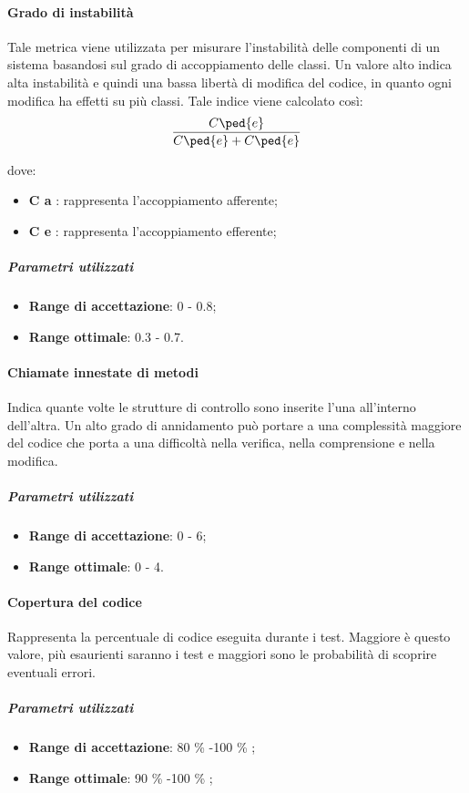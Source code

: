 \documentclass[../PianoDiQualifica.tex]{subfiles}
\begin{document}
					\paragraph{Grado di instabilità}
					Tale metrica viene utilizzata per misurare l'instabilità delle componenti di un sistema basandosi sul grado di accoppiamento delle classi. Un valore alto indica alta instabilità e quindi una bassa libertà di modifica del codice, in quanto ogni modifica ha effetti su più classi. Tale indice viene calcolato così:
					\[
					\frac{C \ped{e} }{C \ped{e}  +C \ped{e} }
					\]
					
					dove:
					\begin{itemize}
						\item \textbf{C \ped a }: rappresenta l'accoppiamento afferente;
						\item \textbf{C \ped e }: rappresenta l'accoppiamento efferente;
					\end{itemize}
					\subparagraph{Parametri utilizzati}
					\begin{itemize}
						\item \textbf{Range di accettazione}: 0 - 0.8;
						\item \textbf{Range ottimale}: 0.3 - 0.7.
					\end{itemize}
					
					\paragraph{Chiamate innestate di metodi}
					Indica quante volte le strutture di controllo sono inserite l'una all'interno dell'altra. Un alto grado di annidamento può portare a una complessità maggiore del codice che porta a una difficoltà nella verifica, nella comprensione e nella modifica.
					\subparagraph{Parametri utilizzati}
					\begin{itemize}
						\item \textbf{Range di accettazione}: 0 - 6;
						\item \textbf{Range ottimale}: 0 - 4.
					\end{itemize}
					
					\paragraph{Copertura del codice}
					Rappresenta la percentuale di codice eseguita durante i test. Maggiore è questo valore, più esaurienti saranno i test e maggiori sono le probabilità di scoprire eventuali errori.
					\subparagraph{Parametri utilizzati}
					\begin{itemize}
						\item \textbf{Range di accettazione}: 80 \% -100 \% ;   
						\item \textbf{Range ottimale}: 90 \% -100 \% ; 
					\end{itemize}
					
\end{document}
